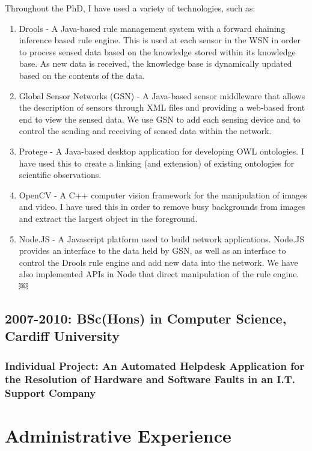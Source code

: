 \documentclass[11pt,fullpage]{article}
\begin{document}
Throughout the PhD, I have used a variety of technologies, such as:
\begin{enumerate}
	\item Drools - A Java-based rule management system with a forward chaining inference based rule engine. This is used at each sensor in the WSN in order to process sensed data based on the knowledge stored within its knowledge base. As new data is received, the knowledge base is dynamically updated based on the contents of the data.
	\item Global Sensor Networks (GSN) - A Java-based sensor middleware that allows the description of sensors through XML files and providing a web-based front end to view the sensed data. We use GSN to add each sensing device and to control the sending and receiving of sensed data within the network.
	\item Protege - A Java-based desktop application for developing OWL ontologies. I have used this to create a linking (and extension) of existing ontologies for scientific observations.
	\item OpenCV - A C++ computer vision framework for the manipulation of images and video. I have used this in order to remove busy backgrounds from images and extract the largest object in the foreground.
	\item Node.JS - A Javascript platform used to build network applications. Node.JS provides an interface to the data held by GSN, as well as an interface to control the Drools rule engine and add new data into the network. We have also implemented APIs in Node that direct manipulation of the rule engine.
￼\end{enumerate}
	
\subsection*{\textbf{2007-2010: BSc(Hons)} in Computer Science, Cardiff University}
\subsubsection*{\textbf{Individual Project:} An Automated Helpdesk Application for the Resolution of Hardware and Software Faults in an I.T. Support Company}

\section*{Administrative Experience}
\end{document}
